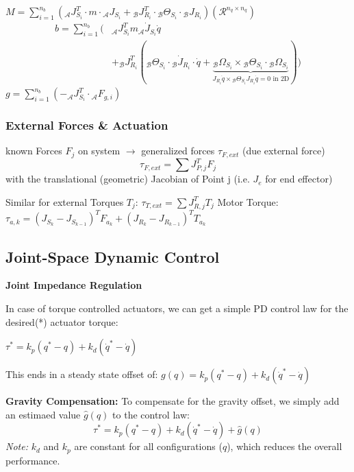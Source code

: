 \documentclass[fontsize=6pt,DIV=calc,a4paper,ngerman]{scrartcl}
\begin{document}
\begin{multicols*}{4}
	$\displaystyle M  = \sum_{i=1}^{n_b}\left({}_\mathcal{A}J_{S_i}^T\cdot m\cdot  {}_\mathcal{A}J_{S_i}+{}_\mathcal{B}J_{R_i}^T\cdot{}_\mathcal{B}\Theta_{S_i}\cdot {}_\mathcal{B}J_{R_i}\right) (\mathcal{R}^{n_q \times n_q})$\\
	\begin{equation*}\begin{split}
			b  = \sum_{i=1}^{n_b}( & {}_\mathcal{A}J_{S_i}^T m {}_\mathcal{A}\dot{J}_{S_i}\dot{q}
			\\ & + {}_\mathcal{B}J_{R_i}^T({}_\mathcal{B}\Theta_{S_i}\cdot {}_\mathcal{B}\dot{J}_{R_i}\cdot \dot{q} +
			\underbrace{{}_\mathcal{B}\Omega_{S_i}\times {}_\mathcal{B}\Theta_{S_i}\cdot {}_\mathcal{B}\Omega_{S_i}}_{J_{R_i}\dot{q} \times {}_\mathcal{B}\Theta_{S_i} J_{R_i}\dot{q} = 0 \text{ in 2D} } ))
		\end{split}\end{equation*}
	$\displaystyle g = \sum_{i=1}^{n_b}\left(-{}_\mathcal{A}J_{S_i}^T\cdot {}_\mathcal{A}F_{g,i}\right)$


	\subsubsection{External Forces \& Actuation}
	known Forces $F_j$ on system $\rightarrow$ generalized forces $\tau_{F,ext}$ (due external force)
	$$\tau_{F,ext} = \sum J_{P,j}^T F_j$$
	with the translational (geometric) Jacobian of Point j (i.e. $J_e$ for end effector)

	Similar for external Torques $T_j$:
	$\displaystyle \tau_{T,ext} = \sum J_{R,j}^TT_{j}$
	Motor Torque: $\tau_{a, k} = (J_{S_k} - J_{S_{k-1}})^T F_{a_k} + (J_{R_k} - J_{R_{k-1}})^T T_{a_k}$

	\subsection{Joint-Space Dynamic Control}
	\textbf{Joint Impedance Regulation}

	In case of torque controlled actuators, we can get a simple PD control law for the desired(*) actuator torque:

	\centerline{$\tau^* = k_p(q^*-q)+k_d(\dot{q}^*-\dot{q})$}
	This ends in a steady state offset of:  $g(q) = k_p(q^*-q)+k_d(\dot{q}^*-\dot{q})$

	\textbf{Gravity Compensation:}
	To compensate for the gravity offset, we simply add an estimaed value $\hat{g}(q)$ to the control law:
	$$\tau^* = k_p(q^*-q)+k_d(\dot{q}^*-\dot{q})+\hat{g}(q)$$
	\textit{Note:} $k_d$ and $k_p$ are constant for all configurations ($q$), which reduces the overall performance.


\end{multicols*}
\end{document}
